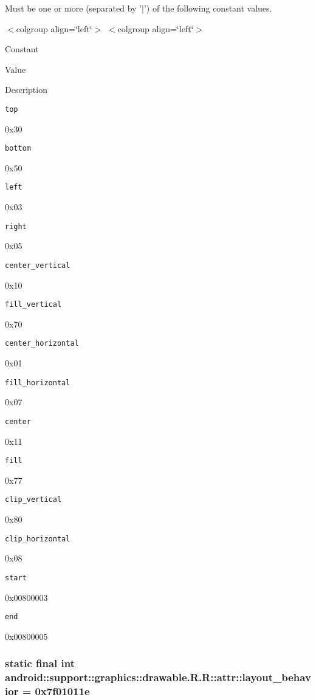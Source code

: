 Must be one or more (separated by '$|$') of the following constant values. \begin{TabularC}{0}
\hline
\end{TabularC}
$<$colgroup align=\char`\"{}left\char`\"{}$>$ $<$colgroup align=\char`\"{}left\char`\"{}$>$ 

Constant

Value

Description 

{\tt top}

0x30

{\tt bottom}

0x50

{\tt left}

0x03

{\tt right}

0x05

{\tt center\_\-vertical}

0x10

{\tt fill\_\-vertical}

0x70

{\tt center\_\-horizontal}

0x01

{\tt fill\_\-horizontal}

0x07

{\tt center}

0x11

{\tt fill}

0x77

{\tt clip\_\-vertical}

0x80

{\tt clip\_\-horizontal}

0x08

{\tt start}

0x00800003

{\tt end}

0x00800005\hypertarget{classandroid_1_1support_1_1graphics_1_1drawable_1_1_r_1_1attr_c970f74dedb25ca43d57e1eb7255f779}{
\subsubsection[{layout\_\-behavior}]{\setlength{\rightskip}{0pt plus 5cm}static final int android::support::graphics::drawable.R.R::attr::layout\_\-behavior = 0x7f01011e}}
\label{classandroid_1_1support_1_1graphics_1_1drawable_1_1_r_1_1attr_c970f74dedb25ca43d57e1eb7255f779}


